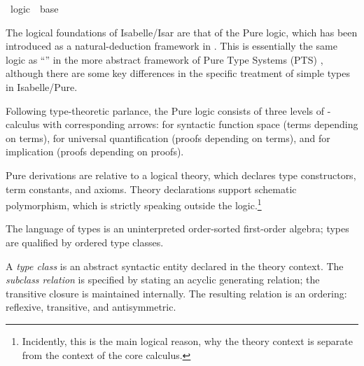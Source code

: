 %
\begin{isabellebody}%
\def\isabellecontext{logic}%
%
\isadelimtheory
\isanewline
\isanewline
\isanewline
%
\endisadelimtheory
%
\isatagtheory
{}\isamarkupfalse%
\ logic\ \ base\ %
\endisatagtheory
{\isafoldtheory}%
%
\isadelimtheory
%
\endisadelimtheory
%
\isamarkuptrue%
%
\begin{isamarkuptext}%
The logical foundations of Isabelle/Isar are that of the Pure logic,
  which has been introduced as a natural-deduction framework in
  \cite{paulson700}.  This is essentially the same logic as ``'' in the more abstract framework of Pure Type Systems (PTS)
  \cite{Barendregt-Geuvers:2001}, although there are some key
  differences in the specific treatment of simple types in
  Isabelle/Pure.

  Following type-theoretic parlance, the Pure logic consists of three
  levels of \isa{{\isasymlambda}}-calculus with corresponding arrows: \isa{{\isasymRightarrow}} for syntactic function space (terms depending on terms), \isa{{\isasymAnd}} for universal quantification (proofs depending on terms), and
  \isa{{\isasymLongrightarrow}} for implication (proofs depending on proofs).

  Pure derivations are relative to a logical theory, which declares
  type constructors, term constants, and axioms.  Theory declarations
  support schematic polymorphism, which is strictly speaking outside
  the logic.\footnote{Incidently, this is the main logical reason, why
  the theory context \isa{{\isasymTheta}} is separate from the context \isa{{\isasymGamma}} of the core calculus.}%
\end{isamarkuptext}%
\isamarkuptrue%
%
\isamarkuptrue%
%
\begin{isamarkuptext}%
The language of types is an uninterpreted order-sorted first-order
  algebra; types are qualified by ordered type classes.

  \medskip A \emph{type class} is an abstract syntactic entity
  declared in the theory context.  The \emph{subclass relation}  is specified by stating an acyclic
  generating relation; the transitive closure is maintained
  internally.  The resulting relation is an ordering: reflexive,
  transitive, and antisymmetric.


\end{isamarkuptext}
\end{isabellebody}
